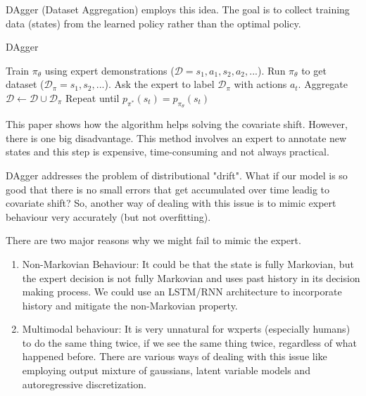 \documentclass[11pt]{article}
\begin{document}
DAgger (Dataset Aggregation) \cite{ross2011reduction} employs this idea. The goal is to collect training data (states) from the learned policy rather than the optimal policy. 

\begin{algorithm}[H]
\caption{DAgger  }
\label{algo:dagger}
\begin{algorithmic}[1]
\STATE Train $\pi_\theta$ using expert demonstrations ($\mathcal{D} = {s_1, a_1, s_2, a_2, ...}$).
\STATE Run $\pi_\theta$ to get dataset ($\mathcal{D_\pi} = {s_1, s_2, ...}$).
\STATE Ask the expert to label $\mathcal{D_\pi}$ with actions $a_t$.
\STATE Aggregate $\mathcal{D} \gets \mathcal{D} \cup \mathcal{D_\pi}$
\STATE Repeat until $ p_{\pi^{*}}(s_t) = p_{\pi_\theta}(s_t)$
\end{algorithmic}
\end{algorithm}

This paper shows how the algorithm helps solving the covariate shift. However, there is one big disadvantage. This method involves an expert to annotate new states and this step is expensive, time-consuming and not always practical.

DAgger addresses the problem of distributional "drift". What if our model is so good that there is no small errors that get accumulated over time leadig to covariate shift? So, another way of dealing with this issue is to mimic expert behaviour very accurately (but not overfitting). 

There are two major reasons why we might fail to mimic the expert.
\begin{enumerate}
    \item Non-Markovian Behaviour: It could be that the state is fully Markovian, but the expert decision is not fully Markovian and uses past history in its decision making process. We could use an LSTM/RNN architecture to incorporate history and mitigate the non-Markovian property.
    
    \item Multimodal behaviour: It is very unnatural for wxperts (especially humans)  to do the same thing twice, if we see the same thing twice, regardless of what happened before.  There are various ways of dealing with this issue like employing output mixture of gaussians, latent variable models and autoregressive discretization. 
\end{enumerate}
\end{document}

